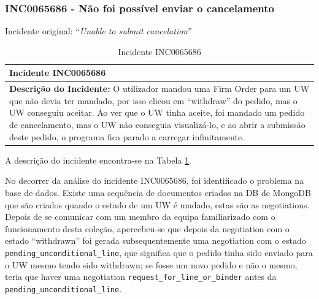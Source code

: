        \subsubsection{INC0065686 - Não foi possível enviar o cancelamento}\label{secsec:inc0065686} %
                
            Incidente original: ``\textit{Unable to submit cancelation}''

            \begin{table}[H] %
                \centering
                \begin{tabularx}{1\textwidth}{|>{\raggedright\arraybackslash}X|}
                    \hline
                    \rowcolor{lightgray}
                    \textbf{Incidente INC0065686} \\
                    \hline
                    \rowcolor{lightgray!20}
                
                    \textbf{Descrição do Incidente:} O utilizador mandou uma Firm Order para um UW que não devia ter mandado, por isso clicou em ``withdraw'' do pedido, mas o UW conseguiu aceitar. Ao ver que o UW tinha aceite, foi mandado um pedido de cancelamento, mas o UW não conseguia visualizá-lo, e ao abrir a submissão deste pedido, o programa fica parado a carregar infinitamente.

                    \\
                    \hline
                \end{tabularx}
                \caption{Incidente INC0065686}\label{table:incINC0065686}
            \end{table}

            A descrição do incidente encontra-se na Tabela \ref{table:incINC0065686}.

            No decorrer da análise do incidente INC0065686, foi identificado o problema na base de dados. Existe uma sequência de documentos criados na DB de MongoDB que são criados quando o estado de um UW é mudado, estas são as negotiations. Depois de se comunicar com um membro da equipa familiarizado com o funcionamento desta coleção, apercebeu-se que depois da negotiation com o estado ``withdrawn'' foi gerada subsequentemente uma negotiation com o estado \texttt{pending\_unconditional\_line}, que significa que o pedido tinha sido enviado para o UW mesmo tendo sido withdrawn; se fosse um novo pedido e não o mesmo, teria que haver uma negotiation \texttt{request\_for\_line\_or\_binder} antes da \texttt{pending\_unconditional\_line}.

